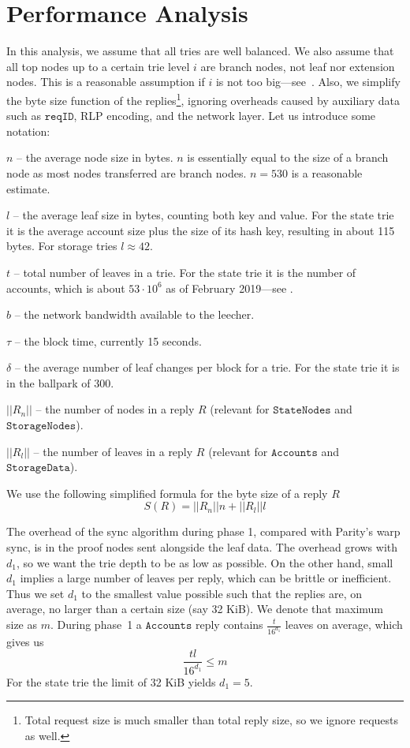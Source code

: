 \documentclass{amsart}
\begin{document}
\section{Performance Analysis}

In this analysis, we assume that all tries are well balanced.
We also assume that all top nodes up to a certain trie level $i$ are branch nodes, not leaf nor extension nodes.
This is a reasonable assumption if $i$ is not too big---see~\cite{akhunov_1x_workshop_part2}.
Also, we simplify the byte size function of the replies\footnote{Total
request size is much smaller than total reply size, so we ignore requests as well.},
ignoring overheads caused by auxiliary data such as $\texttt{reqID}$,
RLP encoding, and the network layer.
Let us introduce some notation:

$n$ -- the average node size in bytes.
$n$ is essentially equal to the size of a branch node as most nodes transferred are branch nodes.
$n = 530$ is a reasonable estimate.

$l$ -- the average leaf size in bytes, counting both key and value.
For the state trie it is the average account size plus the size of its hash key,
resulting in about 115 bytes.
For storage tries $l \approx 42$.

$t$ -- total number of leaves in a trie.
For the state trie it is the number of accounts,
which is about $53 \cdot 10^6$ as of February 2019---see \cite{akhunov_1x_workshop_part2}.

$b$ -- the network bandwidth available to the leecher.

$\tau$ -- the block time, currently 15 seconds.

$\delta$ -- the average number of leaf changes per block for a trie.
For the state trie it is in the ballpark of 300.

$||R_n||$ -- the number of nodes in a reply $R$ (relevant for $\texttt{StateNodes}$ and $\texttt{StorageNodes}$).

$||R_l||$ -- the number of leaves in a reply $R$ (relevant for $\texttt{Accounts}$ and $\texttt{StorageData}$).

We use the following simplified formula for the byte size of a reply $R$
\begin{equation}
    S(R) = ||R_n|| n + ||R_l|| l
\end{equation}

The overhead of the sync algorithm during phase 1, compared with Parity's warp sync, is in the proof nodes sent alongside the leaf data.
The overhead grows with $d_1$, so we want the trie depth to be as low as possible.
On the other hand, small $d_1$ implies a large number of leaves per reply, which can be brittle or inefficient.
Thus we set $d_1$ to the smallest value possible such that the replies are, on average, no larger than a certain size (say 32 KiB).
We denote that maximum size as $m$.
During phase~1 a $\texttt{Accounts}$ reply
contains $\frac{t}{16^{d_1}}$ leaves on average,
which gives us
\begin{equation}
    \frac{tl}{16^{d_1}} \leq m
\end{equation}
For the state trie the limit of 32 KiB yields $d_1 = 5$.
\end{document}
